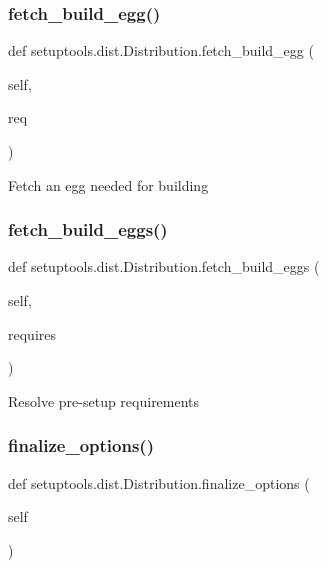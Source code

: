 \subsubsection{\texorpdfstring{fetch\+\_\+build\+\_\+egg()}{fetch\_build\_egg()}}
{\footnotesize\ttfamily def setuptools.\+dist.\+Distribution.\+fetch\+\_\+build\+\_\+egg (\begin{DoxyParamCaption}\item[{}]{self,  }\item[{}]{req }\end{DoxyParamCaption})}

\begin{DoxyVerb}Fetch an egg needed for building\end{DoxyVerb}
 \mbox{\label{classsetuptools_1_1dist_1_1Distribution_a3af6e048cd20731f68583089c6b06b57}} 
\subsubsection{\texorpdfstring{fetch\+\_\+build\+\_\+eggs()}{fetch\_build\_eggs()}}
{\footnotesize\ttfamily def setuptools.\+dist.\+Distribution.\+fetch\+\_\+build\+\_\+eggs (\begin{DoxyParamCaption}\item[{}]{self,  }\item[{}]{requires }\end{DoxyParamCaption})}

\begin{DoxyVerb}Resolve pre-setup requirements\end{DoxyVerb}
 \mbox{\label{classsetuptools_1_1dist_1_1Distribution_a7849615b07629cf6420a420ab46ea199}} 
\subsubsection{\texorpdfstring{finalize\+\_\+options()}{finalize\_options()}}
{\footnotesize\ttfamily def setuptools.\+dist.\+Distribution.\+finalize\+\_\+options (\begin{DoxyParamCaption}\item[{}]{self }\end{DoxyParamCaption})}

